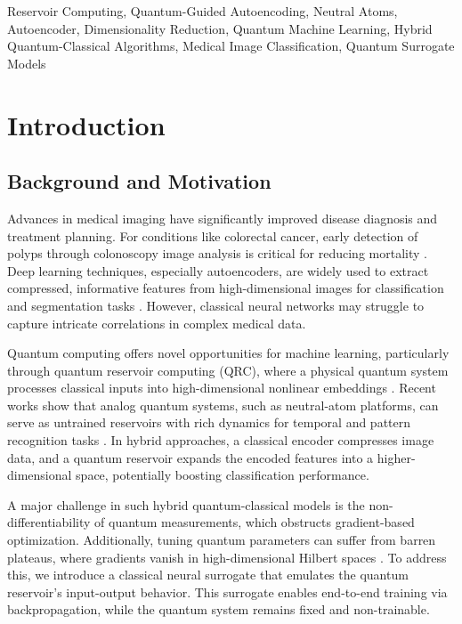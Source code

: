 \documentclass[conference]{IEEEtran}
\begin{document}
\begin{IEEEkeywords}
Reservoir Computing, Quantum-Guided Autoencoding,
Neutral Atoms, Autoencoder, Dimensionality Reduction, 
Quantum Machine Learning, Hybrid Quantum-Classical Algorithms, 
Medical Image Classification, Quantum Surrogate Models
\end{IEEEkeywords}

\section{Introduction}

\subsection{Background and Motivation}
Advances in medical imaging have significantly improved 
disease diagnosis and treatment planning. For conditions 
like colorectal cancer, early detection of polyps through 
colonoscopy image analysis is critical for reducing mortality \cite{estevaGuideDeepLearning2019a}. 
Deep learning techniques, especially autoencoders, are widely 
used to extract compressed, informative features from 
high-dimensional images for classification and segmentation 
tasks \cite{bengioLearningDeepArchitecturesa}. However, classical neural networks may struggle 
to capture intricate correlations in complex medical data.

Quantum computing offers novel opportunities 
for machine learning, particularly through quantum reservoir 
computing (QRC), where a physical quantum system processes 
classical inputs into high-dimensional nonlinear embeddings 
\cite{tanakaRecentAdvancesPhysical2019,fujiiHarnessingDisorderedQuantum2017}. Recent works show that analog quantum systems, 
such as neutral-atom platforms, can serve as untrained 
reservoirs with rich dynamics for temporal and pattern 
recognition tasks \cite{domingoOptimalQuantumReservoir2022,kornjavcaLargescaleQuantumReservoir2024}. 
In hybrid approaches, a classical encoder compresses 
image data, and a quantum reservoir expands 
the encoded features into a higher-dimensional space, 
potentially boosting classification performance.

A major challenge in such hybrid quantum-classical 
models is the non-differentiability of quantum measurements, 
which obstructs gradient-based optimization. Additionally, 
tuning quantum parameters can suffer from barren plateaus, where 
gradients vanish in high-dimensional Hilbert spaces \cite{mccleanBarrenPlateausQuantum2018}. 
To address this, we introduce a classical neural surrogate 
that emulates the quantum reservoir's input-output behavior. 
This surrogate enables end-to-end training via backpropagation, 
while the quantum system remains fixed and non-trainable.
\end{document}
